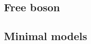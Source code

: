 \documentclass[11pt]{article}
\newcommand{\nn}{\nonumber}
\begin{document}
\subsection{Free boson}




\subsection{Minimal models}



\end{document}

